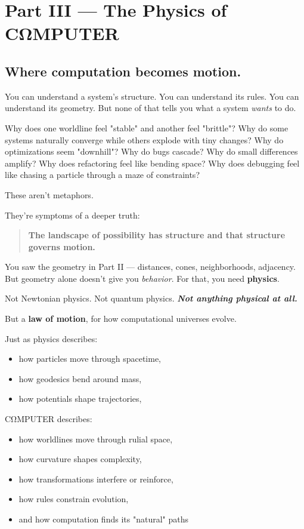 \chapter*{Part III --- The Physics of CΩMPUTER}

\section*{Where computation becomes motion.}

You can understand a system's structure. You can understand its rules.
You can understand its geometry. But none of that tells you what a
system \emph{wants} to do.

Why does one worldline feel "stable" and another feel "brittle"? Why
do some systems naturally converge while others explode with tiny
changes? Why do optimizations seem "downhill"? Why do bugs cascade?
Why do small differences amplify? Why does refactoring feel like bending
space? Why does debugging feel like chasing a particle through a maze of
constraints?

These aren't metaphors.

They're symptoms of a deeper truth:

\begin{quote}
\textbf{The landscape of possibility has structure and that structure
governs motion.}
\end{quote}

You saw the geometry in Part II --- distances, cones, neighborhoods,
adjacency. But geometry alone doesn't give you \emph{behavior}. For
that, you need \textbf{physics}.

Not Newtonian physics. Not quantum physics. \textbf{\emph{Not anything
physical at all.}}

But a \textbf{law of motion}, for how computational universes evolve.

Just as physics describes:

\begin{itemize}
\tightlist
\item
  how particles move through spacetime,\\
\item
  how geodesics bend around mass,
\item
  how potentials shape trajectories,
\end{itemize}

CΩMPUTER describes:

\begin{itemize}
\tightlist
\item
  how worldlines move through rulial space,
\item
  how curvature shapes complexity,
\item
  how transformations interfere or reinforce,
\item
  how rules constrain evolution,
\item
  and how computation finds its "natural" paths
\end{itemize}

